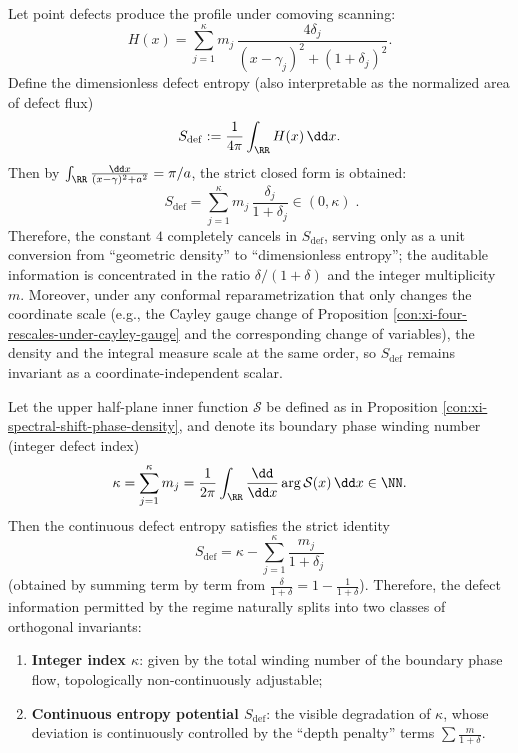 \begin{proposition}\label{con:xi-defect-entropy-coordinate_invariant}
Let point defects produce the profile under comoving scanning:
\[
H(x)=\sum_{j=1}^{\kappa} m_j\,\frac{4\delta_j}{(x-\gamma_j)^2+(1+\delta_j)^2}.
\]
Define the dimensionless defect entropy (also interpretable as the normalized area of defect flux)
\[
S_{\mathrm{def}}
:=\frac{1}{4\pi}\int_{\RR}H(x)\,\dd x.
\]
Then by \(\int_{\RR}\frac{\dd x}{(x-\gamma)^2+a^2}=\pi/a\), the strict closed form is obtained:
\[
\boxed{\;
S_{\mathrm{def}}
=\sum_{j=1}^{\kappa}m_j\,\frac{\delta_j}{1+\delta_j}\in(0,\kappa)\; }.
\]
Therefore, the constant \(4\) completely cancels in \(S_{\mathrm{def}}\), serving only as a unit conversion from ``geometric density'' to ``dimensionless entropy''; the auditable information is concentrated in the ratio \(\delta/(1+\delta)\) and the integer multiplicity \(m\).
Moreover, under any conformal reparametrization that only changes the coordinate scale (e.g., the Cayley gauge change of Proposition \ref{con:xi-four-rescales-under-cayley-gauge} and the corresponding change of variables), the density and the integral measure scale at the same order, so \(S_{\mathrm{def}}\) remains invariant as a coordinate-independent scalar.
\end{proposition}

\begin{proposition}\label{con:xi-index-entropy-strict-separation}
Let the upper half-plane inner function \(\mathcal{S}\) be defined as in Proposition \ref{con:xi-spectral-shift-phase-density}, and denote its boundary phase winding number (integer defect index)
\[
\kappa=\sum_{j=1}^{\kappa}m_j
=\frac{1}{2\pi}\int_{\RR}\frac{\dd}{\dd x}\arg \mathcal{S}(x)\,\dd x\in\NN.
\]
Then the continuous defect entropy satisfies the strict identity
\[
\boxed{\;
S_{\mathrm{def}}
=\kappa-\sum_{j=1}^{\kappa}\frac{m_j}{1+\delta_j}\;}
\]
(obtained by summing term by term from \( \frac{\delta}{1+\delta}=1-\frac{1}{1+\delta}\)).
Therefore, the defect information permitted by the regime naturally splits into two classes of orthogonal invariants:
\begin{enumerate}
  \item \textbf{Integer index \(\kappa\)}: given by the total winding number of the boundary phase flow, topologically non-continuously adjustable;
  \item \textbf{Continuous entropy potential \(S_{\mathrm{def}}\)}: the visible degradation of \(\kappa\), whose deviation is continuously controlled by the ``depth penalty'' terms \(\sum \frac{m}{1+\delta}\).
\end{enumerate}
\end{proposition}

